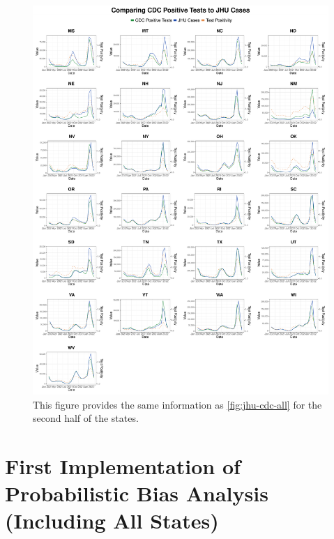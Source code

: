 \documentclass[12pt,twoside]{smiththesis}
\begin{document}
\begin{figure}

{\centering \includegraphics[width=1\linewidth]{figure/jhu_cdc_all_states_2} 

}

\caption{\label{fig:jhu-cdc-all2} This figure provides the same information as \ref{fig:jhu-cdc-all} for the second half of the states.}\label{fig:unnamed-chunk-109}
\end{figure}
\hypertarget{first-implementation-of-probabilistic-bias-analysis-including-all-states}{%
\section{First Implementation of Probabilistic Bias Analysis (Including All States)}\label{first-implementation-of-probabilistic-bias-analysis-including-all-states}}
\end{document}
